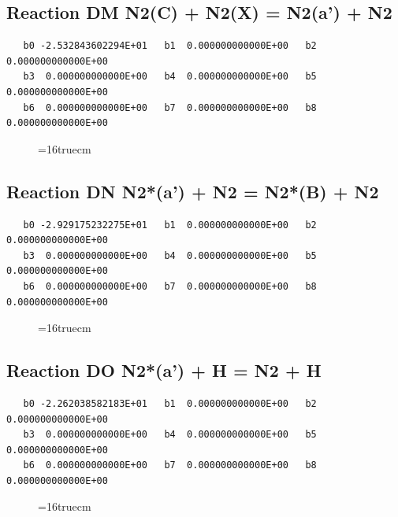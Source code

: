 \documentclass[12pt,dvipdfm]{article}
\begin{document}
\subsection{
Reaction DM N2(C) + N2(X) = N2(a') + N2 }
\begin{small}\begin{verbatim}
   b0 -2.532843602294E+01   b1  0.000000000000E+00   b2  0.000000000000E+00
   b3  0.000000000000E+00   b4  0.000000000000E+00   b5  0.000000000000E+00
   b6  0.000000000000E+00   b7  0.000000000000E+00   b8  0.000000000000E+00
\end{verbatim}\end{small}
\begin{figure}[h!] \label{n2rates}
\epsfxsize=16truecm
\end{figure}
\newpage

\subsection{
Reaction DN N2*(a') + N2 = N2*(B) + N2 }
\begin{small}\begin{verbatim}
   b0 -2.929175232275E+01   b1  0.000000000000E+00   b2  0.000000000000E+00
   b3  0.000000000000E+00   b4  0.000000000000E+00   b5  0.000000000000E+00
   b6  0.000000000000E+00   b7  0.000000000000E+00   b8  0.000000000000E+00
\end{verbatim}\end{small}
\begin{figure}[h!] \label{n2rates}
\epsfxsize=16truecm
\end{figure}
\newpage

\subsection{
Reaction DO N2*(a') + H = N2 + H }
\begin{small}\begin{verbatim}
   b0 -2.262038582183E+01   b1  0.000000000000E+00   b2  0.000000000000E+00
   b3  0.000000000000E+00   b4  0.000000000000E+00   b5  0.000000000000E+00
   b6  0.000000000000E+00   b7  0.000000000000E+00   b8  0.000000000000E+00
\end{verbatim}\end{small}
\begin{figure}[h!] \label{n2rates}
\epsfxsize=16truecm
\end{figure}
\newpage
\end{document}
